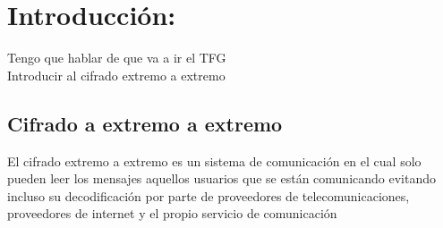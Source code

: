 \chapter{Introducción:}

Tengo que hablar de que va a ir el TFG \\
Introducir al cifrado extremo a extremo \\

\section{Cifrado a extremo a extremo}
El cifrado extremo a extremo es un sistema de comunicación en el cual solo pueden leer los mensajes aquellos usuarios que se están comunicando evitando incluso su decodificación por parte de proveedores de telecomunicaciones, proveedores de internet y el propio servicio de comunicación

